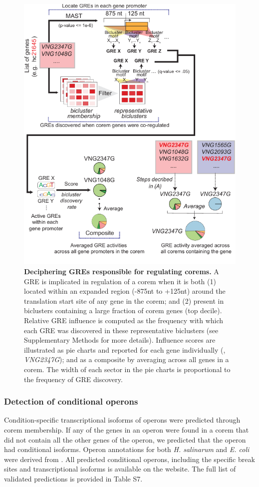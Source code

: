 \begin{figure}[h!]
\centering
\includegraphics[width=0.7\linewidth]{figures/corem_gres.pdf}
\caption[Deciphering GREs responsible for regulating corems]{\textbf{Deciphering GREs responsible for regulating corems.} A GRE is implicated in regulation of a corem when it is both (1) located within an expanded region (-875nt to +125nt) around the translation start site of any gene in the corem; and (2) present in biclusters containing a large fraction of corem genes (top decile). Relative GRE influence is computed as the frequency with which each GRE was discovered in these representative biclusters (see Supplementary Methods for more details). Influence scores are illustrated as pie charts and reported for each gene individually (\eg, \textit{VNG2347G}); and as a composite by averaging across all genes in a corem. The width of each sector in the pie charts is proportional to the frequency of GRE discovery.}
\label{fig:corem_gres}
\end{figure}

\subsubsection{Detection of conditional operons}
\label{section:condop}
Condition-specific transcriptional isoforms of operons were predicted through corem membership. If any of the genes in an operon were found in a corem that did not contain all the other genes of the operon, we predicted that the operon had conditional isoforms. Operon annotations for both {\it H. salinarum} and {\it E. coli} were derived from  \cite{alm_microbesonline_2005}. All predicted conditional operons, including the specific break sites and transcriptional isoforms is available on the website. The full list of validated predictions is provided in Table S7.
